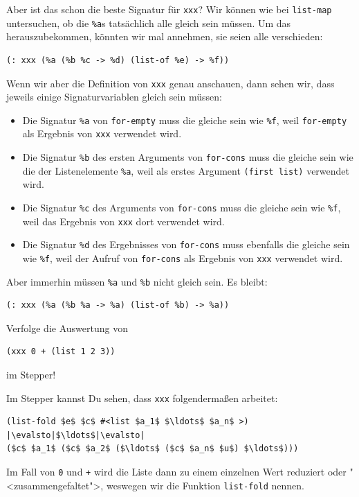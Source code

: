 Aber ist das schon die beste Signatur für \lstinline{xxx}?  Wir können
wie bei \lstinline{list-map} untersuchen, ob die \lstinline{%a}s
tatsächlich alle gleich sein müssen.  Um das herauszubekommen, könnten
wir mal annehmen, sie seien alle verschieden:
\begin{lstlisting}
(: xxx (%a (%b %c -> %d) (list-of %e) -> %f))
\end{lstlisting}
%
Wenn wir aber die Definition von \lstinline{xxx} genau anschauen, dann
sehen wir, dass jeweils einige Signaturvariablen gleich sein müssen:
%
\begin{itemize}
\item Die Signatur \lstinline{%a} von \lstinline{for-empty} muss die
  gleiche sein wie \lstinline{%f}, weil \lstinline{for-empty} als
  Ergebnis von \lstinline{xxx} verwendet wird.
\item Die Signatur \lstinline{%b} des ersten Arguments von
    \lstinline{for-cons} muss die gleiche sein wie die der
    Listenelemente \lstinline{%a}, weil als erstes Argument
      \lstinline{(first list)} verwendet wird.
\item Die Signatur \lstinline{%c} des Arguments von
    \lstinline{for-cons} muss die gleiche sein wie \lstinline{%f},
     weil das Ergebnis von \lstinline{xxx} dort verwendet wird.
\item Die Signatur \lstinline{%d} des Ergebnisses von
    \lstinline{for-cons} muss ebenfalls die gleiche sein wie
    \lstinline{%f}, weil der Aufruf von \lstinline{for-cons} als
    Ergebnis von \lstinline{xxx} verwendet wird.
\end{itemize}
%
Aber immerhin müssen \lstinline{%a} und \lstinline{%b} nicht gleich
sein.  Es bleibt:
%
\begin{lstlisting}
(: xxx (%a (%b %a -> %a) (list-of %b) -> %a))
\end{lstlisting}
%
\begin{aufgabeinline}
  Verfolge die Auswertung von
\begin{lstlisting}
(xxx 0 + (list 1 2 3))
\end{lstlisting}
  im Stepper!
\end{aufgabeinline}
%
Im Stepper kannst Du sehen, dass \lstinline{xxx} folgendermaßen arbeitet:
%
\begin{lstlisting}
(list-fold $e$ $c$ #<list $a_1$ $\ldots$ $a_n$ >)
|\evalsto|$\ldots$|\evalsto|
($c$ $a_1$ ($c$ $a_2$ ($\ldots$ ($c$ $a_n$ $u$) $\ldots$)))
\end{lstlisting}
%
Im Fall von \lstinline{0} und \lstinline{+} wird die Liste dann zu
einem einzelnen Wert reduziert oder "<zusammengefaltet">, weswegen wir
die Funktion \lstinline{list-fold} nennen.

